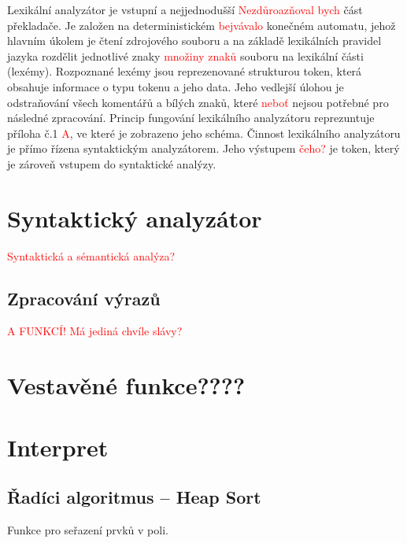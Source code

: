 \documentclass[a4paper, 12pt]{article}
\begin{document}
Lexikální analyzátor je vstupní a nejjednodušší \textcolor{red}{Nezdůroazňoval bych} část překladače. Je založen na deterministickém \textcolor{red}{bejvávalo} konečném automatu,
jehož hlavním úkolem je čtení zdrojového souboru a na základě lexikálních pravidel jazyka rozdělit jednotlivé znaky \textcolor{red}{množiny znaků}
souboru na lexikální části (lexémy). Rozpoznané lexémy jsou reprezenované strukturou token, která obsahuje informace o typu
tokenu a jeho data. Jeho vedlejší úlohou je odstraňování všech komentářů a bílých znaků, které \textcolor{red}{neboť} nejsou potřebné pro
následné zpracování. Princip fungování lexikálního analyzátoru reprezuntuje příloha č.1 \textcolor{red}{A}, ve které je zobrazeno jeho schéma.
Činnost lexikálního analyzátoru je přímo řízena syntaktickým analyzátorem. Jeho výstupem \textcolor{red}{čeho?} je token,
který je zároveň vstupem do syntaktické analýzy.

\section{Syntaktický analyzátor} \label{parser}

\textcolor{red}{Syntaktická a sémantická analýza?}

\subsection{Zpracování výrazů}
\textcolor{red}{A FUNKCÍ! Má jediná chvíle slávy?}

\section{Vestavěné funkce????} \label{vestavene}

\section{Interpret} \label{interpret}

\subsection{Řadíci algoritmus -- Heap Sort}
Funkce pro seřazení prvků v poli.
\end{document}
